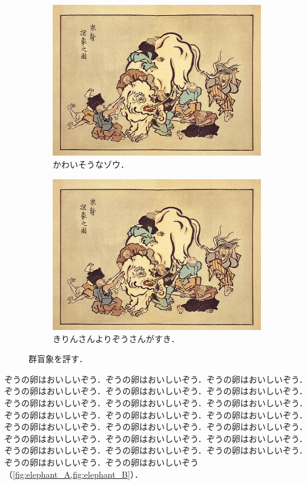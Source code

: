 \documentclass[
	10pt,
	a4j,		%
	twocolumn,	%
	uplatex
]{jsarticle}
\renewcommand{\ref}{\cref}
\begin{document}
\begin{figure}[t]
	\centering
	\begin{subfigure}{0.5\textwidth}
		\includegraphics[clip,width=\textwidth]{fig/elephant.jpg}
		\caption{
			かわいそうなゾウ．
			\label{fig:elephant_A}
		}
	\end{subfigure}
	\begin{subfigure}{0.5\textwidth}
		\includegraphics[clip,width=\textwidth]{fig/elephant.jpg}
		\caption{
			きりんさんよりぞうさんがすき．
			\label{fig:elephant_B}
		}
	\end{subfigure}
	\caption{
		群盲象を評す．
		\label{fig:elephant}
	}
\end{figure}

ぞうの卵はおいしいぞう．ぞうの卵はおいしいぞう．ぞうの卵はおいしいぞう．ぞうの卵はおいしいぞう．ぞうの卵はおいしいぞう．ぞうの卵はおいしいぞう．ぞうの卵はおいしいぞう．ぞうの卵はおいしいぞう．ぞうの卵はおいしいぞう．ぞうの卵はおいしいぞう．ぞうの卵はおいしいぞう．ぞうの卵はおいしいぞう．ぞうの卵はおいしいぞう．ぞうの卵はおいしいぞう．ぞうの卵はおいしいぞう．ぞうの卵はおいしいぞう．ぞうの卵はおいしいぞう．ぞうの卵はおいしいぞう．ぞうの卵はおいしいぞう．ぞうの卵はおいしいぞう．ぞうの卵はおいしいぞう．ぞうの卵はおいしいぞう．ぞうの卵はおいしいぞう（\ref{fig:elephant_A,fig:elephant_B}）．
\end{document}
